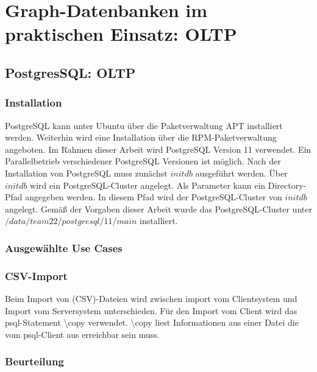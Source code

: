 \chapter{Graph-Datenbanken im praktischen Einsatz: OLTP}
\section{PostgresSQL: OLTP}
\subsection{Installation}
PostgreSQL kann unter Ubuntu über die Paketverwaltung APT installiert werden. Weiterhin wird eine Installation über die RPM-Paketverwaltung angeboten. Im Rahmen dieser Arbeit wird PostgreSQL Version 11 verwendet. Ein Parallelbetrieb verschiedener PostgreSQL Versionen ist möglich. 
Nach der Installation von PostgreSQL muss zunächst $initdb$ ausgeführt werden. Über $initdb$ wird ein PostgreSQL-Cluster angelegt. Als Parameter kann ein Directory-Pfad angegeben werden. In diesem Pfad wird der PostgreSQL-Cluster von $initdb$ angelegt.
Gemäß der Vorgaben dieser Arbeit wurde das PostgreSQL-Cluster unter $/data/team22/postgresql/11/main$ installiert.
\subsection{Ausgewählte Use Cases}
\subsection{CSV-Import}
Beim Import von (CSV)-Dateien wird zwischen import vom Clientsystem und  Import vom Serversystem unterschieden. 
Für den Import vom Client wird das psql-Statement \textbackslash copy verwendet. \textbackslash copy liest Informationen aus einer Datei die vom psql-Client aus erreichbar sein muss. \cite{postgres2018}


\subsection{Beurteilung}